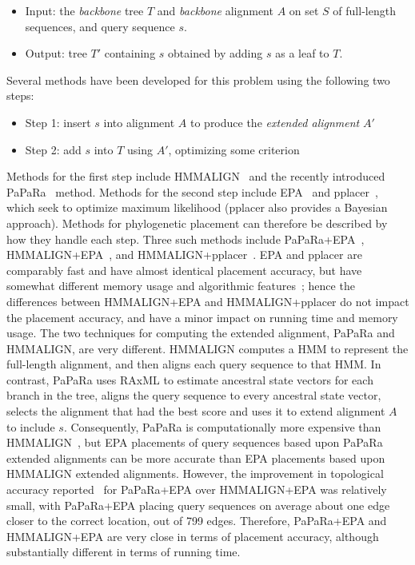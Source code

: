 
\begin{itemize}
\item Input: the {\em backbone} tree $T$ and {\em backbone} alignment $A$ on set $S$ of full-length sequences,
and query sequence $s$.
\item Output: tree $T'$ containing $s$ obtained by adding $s$ as a leaf to
$T$.
\end{itemize}

Several methods have been developed for this problem using
the following two steps:
\begin{itemize}
\item Step 1: insert $s$ into alignment $A$ to produce the
{\em extended alignment} $A'$
\item Step 2: add $s$ into $T$ using $A'$, optimizing some criterion
\end{itemize}
Methods for the first step 
include HMMALIGN~\cite{Eddy1998}
and the recently introduced PaPaRa~\cite{Berger2011a} method.  
Methods for the second step include 
 EPA~\cite{Berger2011} and pplacer~\cite{Matsen2010}, which
seek to optimize maximum likelihood
(pplacer also provides a Bayesian approach).
Methods for phylogenetic placement can therefore
be described
by how they handle each step.
Three such methods
include PaPaRa+EPA~\cite{Berger2011a},
HMMALIGN+EPA~\cite{Berger2011},
and HMMALIGN+pplacer~\cite{Matsen2010}.
EPA and pplacer are comparably 
fast and have almost identical 
placement accuracy,
  but have somewhat
different memory usage and algorithmic features~\cite{Matsen2010};
hence the differences between HMMALIGN+EPA and HMMALIGN+pplacer
do not impact the placement accuracy, and have a minor
impact on running time and memory usage.
The two techniques for computing the extended alignment,
PaPaRa and HMMALIGN, are very different.
HMMALIGN computes a HMM to represent the full-length alignment,
and then aligns each query sequence to that HMM.  In contrast,
PaPaRa uses RAxML to estimate ancestral state 
vectors for each branch in the
tree, aligns the query sequence to every ancestral state
vector, selects the alignment that had the best score and uses
it to extend
alignment $A$ to include $s$.
Consequently, PaPaRa is computationally more 
expensive than HMMALIGN~\cite{Berger2011a}, but EPA placements
of query sequences based upon PaPaRa extended alignments can be
more accurate than EPA placements based upon HMMALIGN extended alignments.
However, the improvement in topological accuracy reported~\cite{Berger2011a}  for
PaPaRa+EPA over HMMALIGN+EPA was
relatively small, with PaPaRa+EPA placing
query sequences on average
about one edge closer to the correct
location, out of 799 edges. 
Therefore, PaPaRa+EPA and HMMALIGN+EPA are very close
in terms of placement accuracy, although substantially different
in terms of running time.  

